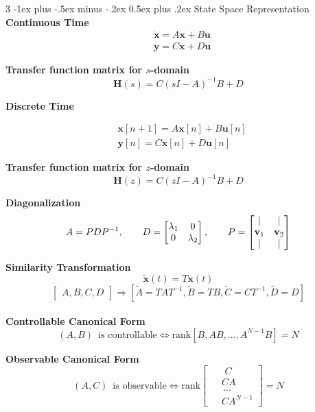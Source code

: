 \documentclass[10pt,landscape]{article}
\makeatletter
\renewcommand{\section}{\@startsection{section}{1}{0mm}%
        {-1ex plus -.5ex minus -.2ex}%
            {0.5ex plus .2ex}%
                {\normalfont\large\bfseries}}
\makeatother
\begin{document}
\begin{multicols}{3}
    \section{State Space Representation}
    \textbf{Continuous Time}
    \[\begin{aligned}
        &\dot{\mathbf{x}}=A\mathbf{x}+ B\mathbf{u}\\
        &\mathbf{y}=C\mathbf{x}+D\mathbf{u}
    \end{aligned}\]
    
    \textbf{Transfer function matrix for $s$-domain}
    \[\mathbf{H}(s)=C(sI-A)^{-1}B+D\]
    
    \textbf{Discrete Time}

    \[\begin{aligned}
    &{\mathbf{x}}[n+1]=A\mathbf{x}[n]+ B\mathbf{u}[n]\\
    &\mathbf{y}[n]=C\mathbf{x}[n]+D\mathbf{u}[n]\end{aligned}\]
    
   \textbf{Transfer function matrix for $z$-domain}
    \[\mathbf{H}(z)=C(zI-A)^{-1}B+D\]

    \textbf{Diagonalization}  
    \[A = P D P^{-1} ,\qquad D=\begin{bmatrix}
    \lambda_1 & 0\\
    0 & \lambda_2
    \end{bmatrix},
    \qquad
    P=\begin{bmatrix}
    \vert & \vert\\
    \vb{v}_1 & \vb{v}_2\\
    \vert & \vert
    \end{bmatrix}\]

    \textbf{Similarity Transformation}
    \[\tilde{\mathbf{x}}(t)=T\mathbf{x}(t)\]
    \[ \begin{bmatrix}
        A,B,C,D
    \end{bmatrix}\Rightarrow [\tilde{A}=TAT^{-1}, \tilde{B}=TB, \tilde{C}= CT^{-1}, \tilde{D}=D]\]\\[6pt]

    \textbf{Controllable Canonical Form}
    \[(A,B) \,\text{ is controllable} \Leftrightarrow \text{rank}[B,AB,...,A^{N-1}B] = N\]

    \textbf{Observable Canonical Form}
    \[(A,C) \,\text{ is observable} \Leftrightarrow \text{rank}\left[\begin{aligned}
        &\,\,\,\, C\\
        &\,\,CA\\
        &\,\,\,...\\
        &\,\,CA^{N-1}
    \end{aligned} \right]= N\]


\end{multicols}
\end{document}
